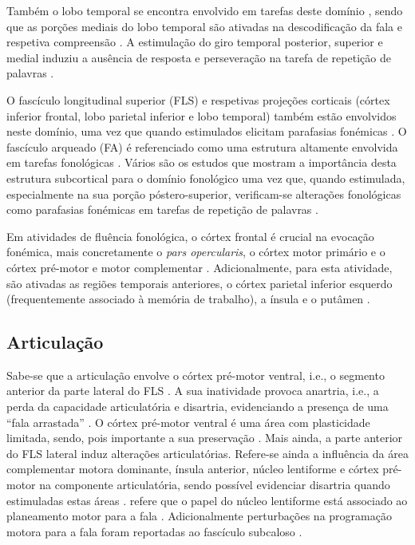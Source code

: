 \documentclass[output=paper,colorlinks,citecolor=brown,booklanguage=portuguese]{langscibook}
\begin{document}
Também o lobo temporal se encontra envolvido em tarefas deste domínio \citep{Duffau2007}, sendo que as porções mediais do lobo temporal são ativadas na descodificação da fala e respetiva compreensão \citep{Hickok2012}. A estimulação do giro temporal posterior, superior e medial induziu a ausência de resposta e perseveração na tarefa de repetição de palavras \citep{Coello2013}. 

O fascículo longitudinal superior (FLS) e respetivas projeções corticais (córtex inferior frontal, lobo parietal inferior e lobo temporal) também estão envolvidos neste domínio, uma vez que quando estimulados elicitam parafasias fonémicas \citep{Coello2013}. O fascículo arqueado (FA) é referenciado como uma estrutura altamente envolvida em tarefas fonológicas \citep{Duffau2007}. Vários são os estudos que mostram a importância desta estrutura subcortical para o domínio fonológico uma vez que, quando estimulada, especialmente na sua porção póstero-superior, verificam-se alterações fonológicas como parafasias fonémicas em tarefas de repetição de palavras \citep{Coello2013, Maldonado2011, MoritzGasser2013}.

Em atividades de fluência fonológica, o córtex frontal é crucial na evocação fonémica, mais concretamente o \emph{pars opercularis}, o córtex motor primário e o córtex pré-motor e motor complementar \citep{Duffau2005}. Adicionalmente, para esta atividade, são ativadas as regiões temporais anteriores, o córtex parietal inferior esquerdo (frequentemente associado à memória de trabalho), a ínsula e o putâmen \citep{Baldo2006, Duffau2007}.

\subsection{Articulação}

Sabe-se que a articulação envolve o córtex pré-motor ventral, i.e., o segmento anterior da parte lateral do FLS \citep{Maldonado2011}. A sua inatividade provoca anartria, i.e., a perda da capacidade articulatória \citep{Geemen2014} e disartria, evidenciando a presença de uma “fala arrastada” \citep{Duffau2005, MoritzGasser2013}. O córtex pré-motor ventral é uma área com plasticidade limitada, sendo, pois importante a sua preservação \citep{Geemen2014, Maldonado2011}. Mais ainda, a parte anterior do FLS lateral induz alterações articulatórias. Refere-se ainda a influência da área complementar motora dominante, ínsula anterior, núcleo lentiforme e córtex pré-motor na componente articulatória, sendo possível evidenciar disartria quando estimuladas estas áreas \citep{Coello2013, MoritzGasser2013}. \citet{Duffau2007} refere que o papel do núcleo lentiforme está associado ao planeamento motor para a fala \citep{Duffau2007}. Adicionalmente perturbações na programação motora para a fala foram reportadas ao fascículo subcaloso \citep{Coello2013}. 
\end{document}
